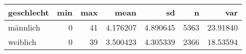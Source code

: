 
\begin{tabular}{lrrrrrr}
\toprule
geschlecht & min & max & mean & sd & n & var\\
\midrule
männlich & 0 & 41 & 4.176207 & 4.890645 & 5363 & 23.91840\\
weiblich & 0 & 39 & 3.500423 & 4.305339 & 2366 & 18.53594\\
\bottomrule
\end{tabular}